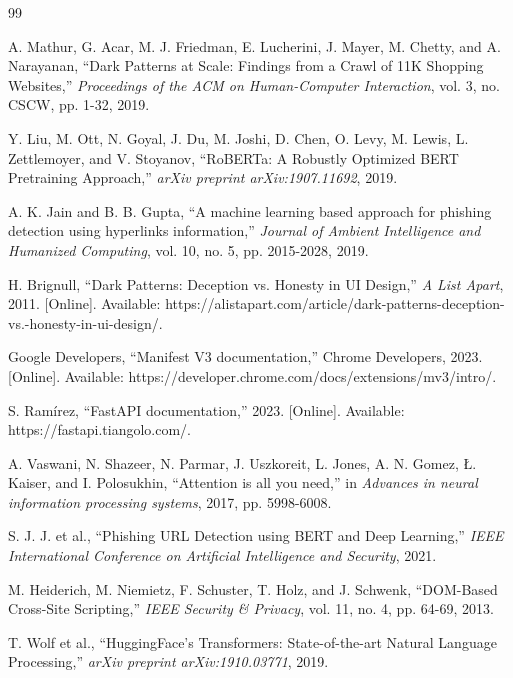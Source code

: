\clearpage
{}

\begin{thebibliography}{99}

A. Mathur, G. Acar, M. J. Friedman, E. Lucherini, J. Mayer, M. Chetty, and A. Narayanan, ``Dark Patterns at Scale: Findings from a Crawl of 11K Shopping Websites,'' \textit{Proceedings of the ACM on Human-Computer Interaction}, vol. 3, no. CSCW, pp. 1-32, 2019.

Y. Liu, M. Ott, N. Goyal, J. Du, M. Joshi, D. Chen, O. Levy, M. Lewis, L. Zettlemoyer, and V. Stoyanov, ``RoBERTa: A Robustly Optimized BERT Pretraining Approach,'' \textit{arXiv preprint arXiv:1907.11692}, 2019.

A. K. Jain and B. B. Gupta, ``A machine learning based approach for phishing detection using hyperlinks information,'' \textit{Journal of Ambient Intelligence and Humanized Computing}, vol. 10, no. 5, pp. 2015-2028, 2019.

H. Brignull, ``Dark Patterns: Deception vs. Honesty in UI Design,'' \textit{A List Apart}, 2011. [Online]. Available: https://alistapart.com/article/dark-patterns-deception-vs.-honesty-in-ui-design/.

Google Developers, ``Manifest V3 documentation,'' Chrome Developers, 2023. [Online]. Available: https://developer.chrome.com/docs/extensions/mv3/intro/.

S. Ramírez, ``FastAPI documentation,'' 2023. [Online]. Available: https://fastapi.tiangolo.com/.

A. Vaswani, N. Shazeer, N. Parmar, J. Uszkoreit, L. Jones, A. N. Gomez, Ł. Kaiser, and I. Polosukhin, ``Attention is all you need,'' in \textit{Advances in neural information processing systems}, 2017, pp. 5998-6008.

S. J. J. et al., ``Phishing URL Detection using BERT and Deep Learning,'' \textit{IEEE International Conference on Artificial Intelligence and Security}, 2021.

M. Heiderich, M. Niemietz, F. Schuster, T. Holz, and J. Schwenk, ``DOM-Based Cross-Site Scripting,'' \textit{IEEE Security \& Privacy}, vol. 11, no. 4, pp. 64-69, 2013.

T. Wolf et al., ``HuggingFace's Transformers: State-of-the-art Natural Language Processing,'' \textit{arXiv preprint arXiv:1910.03771}, 2019.

\end{thebibliography}
